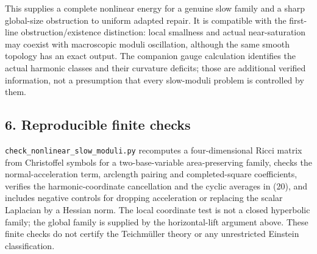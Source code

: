 \documentclass[
  11pt,
]{article}
\begin{document}
This supplies a complete nonlinear energy for a genuine slow family and
a sharp global-size obstruction to uniform adapted repair. It is
compatible with the first-line obstruction/existence distinction: local
smallness and actual near-saturation may coexist with macroscopic moduli
oscillation, although the same smooth topology has an exact output. The
companion gauge calculation identifies the actual harmonic classes and
their curvature deficits; those are additional verified information, not
a presumption that every slow-moduli problem is controlled by them.

\hypertarget{reproducible-finite-checks}{%
\subsection{6. Reproducible finite
checks}\label{reproducible-finite-checks}}

\texttt{check\_nonlinear\_slow\_moduli.py} recomputes a four-dimensional
Ricci matrix from Christoffel symbols for a two-base-variable
area-preserving family, checks the normal-acceleration term, arclength
pairing and completed-square coefficients, verifies the
harmonic-coordinate cancellation and the cyclic averages in (20), and
includes negative controls for dropping acceleration or replacing the
scalar Laplacian by a Hessian norm. The local coordinate test is not a
closed hyperbolic family; the global family is supplied by the
horizontal-lift argument above. These finite checks do not certify the
Teichmüller theory or any unrestricted Einstein classification.
\end{document}

